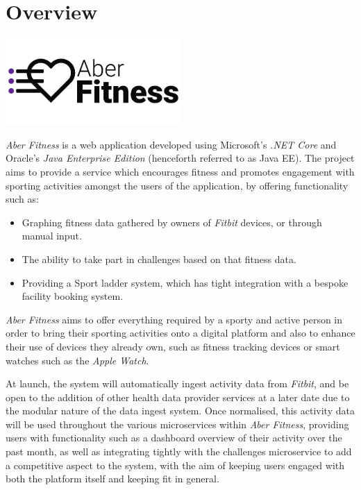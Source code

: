 \chapter{Overview}

\begin{center}
	\includegraphics[width=0.5\textwidth]{Images/aberfitness.png}
\end{center}

\par
\textit{Aber Fitness} is a web application developed using Microsoft's \textit{.NET Core} and Oracle's \textit{Java Enterprise Edition} (henceforth referred to as Java EE). The project aims to provide a service which encourages fitness and promotes engagement with sporting activities amongst the users of the application, by offering functionality such as:

\begin{itemize}
	\item Graphing fitness data gathered by owners of \textit{Fitbit} devices, or through manual input.
	\item The ability to take part in challenges based on that fitness data.
	\item Providing a Sport ladder system, which has tight integration with a bespoke facility booking system.
\end{itemize}

\textit{Aber Fitness} aims to offer everything required by a sporty and active person in order to bring their sporting activities onto a digital platform and also to enhance their use of devices they already own, such as fitness tracking devices or smart watches such as the \textit{Apple Watch}.

\par
At launch, the system will automatically ingest activity data from \textit{Fitbit}, and be open to the addition of other health data provider services at a later date due to the modular nature of the data ingest system. Once normalised, this activity data will be used throughout the various microservices within \textit{Aber Fitness}, providing users with functionality such as a dashboard overview of their activity over the past month, as well as integrating tightly with the challenges microservice to add a competitive aspect to the system, with the aim of keeping users engaged with both the platform itself and keeping fit in general.

